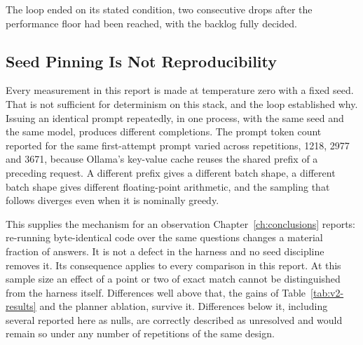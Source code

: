 The loop ended on its stated condition, two consecutive drops after the
performance floor had been reached, with the backlog fully decided.

\subsection{Seed Pinning Is Not Reproducibility}
\label{sec:reproducibility}

Every measurement in this report is made at temperature zero with a fixed
seed. That is not sufficient for determinism on this stack, and the loop
established why. Issuing an identical prompt repeatedly, in one process, with
the same seed and the same model, produces different completions. The prompt
token count reported for the same first-attempt prompt varied across
repetitions, 1218, 2977 and 3671, because Ollama's key-value cache reuses the
shared prefix of a preceding request. A different prefix gives a different
batch shape, a different batch shape gives different floating-point
arithmetic, and the sampling that follows diverges even when it is nominally
greedy.

This supplies the mechanism for an observation Chapter~\ref{ch:conclusions}
reports: re-running byte-identical code over the same questions changes a
material fraction of answers. It is not a defect in the harness and no seed
discipline removes it. Its consequence applies to every comparison in this
report. At this sample size an effect of a point or two of exact match cannot
be distinguished from the harness itself. Differences well above that, the
gains of Table~\ref{tab:v2-results} and the planner ablation, survive it.
Differences below it, including several reported here as nulls, are correctly
described as unresolved and would remain so under any number of repetitions of
the same design.
